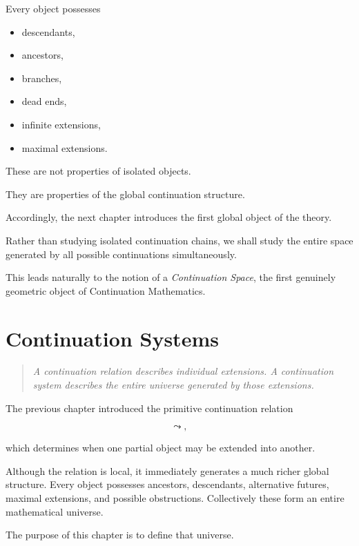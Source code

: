 \documentclass[13pt,openany]{book}
\theoremstyle{plain}
\theoremstyle{definition}
\begin{document}
Every object possesses

\begin{itemize}
\item descendants,
\item ancestors,
\item branches,
\item dead ends,
\item infinite extensions,
\item maximal extensions.
\end{itemize}

These are not properties of isolated objects.

They are properties of the global continuation structure.

Accordingly, the next chapter introduces the first global object of the
theory.

Rather than studying isolated continuation chains, we shall study the
entire space generated by all possible continuations simultaneously.

This leads naturally to the notion of a \emph{Continuation Space}, the
first genuinely geometric object of Continuation Mathematics.

\chapter{Continuation Systems}

\begin{quote}
\emph{A continuation relation describes individual extensions. A
continuation system describes the entire universe generated by those
extensions.}
\end{quote}

\vspace{1em}

The previous chapter introduced the primitive continuation relation

\[
\leadsto,
\]

which determines when one partial object may be extended into another.

Although the relation is local, it immediately generates a much richer
global structure. Every object possesses ancestors, descendants,
alternative futures, maximal extensions, and possible obstructions.
Collectively these form an entire mathematical universe.

The purpose of this chapter is to define that universe.
\end{document}

